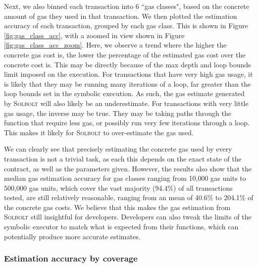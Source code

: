 Next, we also binned each transaction into 6 ``gas classes", based on the concrete amount of 
gas they used in that transaction. We then plotted the estimation accuracy of each transaction, 
grouped by each gas class. This is shown in Figure \ref{fig:gas_class_acc}, with a zoomed in view
shown in Figure \ref{fig:gas_class_acc_zoom}. Here, we observe a trend where the higher the
concrete gas cost is, the lower the percentage of the estimated gas cost over the concrete cost is.
This may be directly because of the max depth and loop bounds limit imposed on the execution.
For transactions that have very high gas usage, it is likely that they may be running many iterations
of a loop, far greater than the loop bounds set in the symbolic execution. As such, the gas
estimate generated by \textcolor{NavyBlue}{\textsc{Solbolt}} will also likely be an underestimate. For transactions with very
little gas usage, the inverse may be true. They may be taking paths through the function that require
less gas, or possibly run very few iterations through a loop. This makes it likely for \textcolor{NavyBlue}{\textsc{Solbolt}}
to over-estimate the gas used. 

We can clearly see that precisely estimating the concrete gas used
by every transaction is not a trivial task, as each this depends on the exact state of the contract, 
as well as the parameters given. However, the results also show that the
median gas estimation accuracy for gas classes ranging from 10,000 gas units to 500,000 gas units,
which cover the vast majority (94.4\%) of all transactions tested,
are still relatively reasonable, ranging from an mean of 40.6\% to 204.1\% of the concrete gas costs. 
We believe that this makes the gas estimation from \textcolor{NavyBlue}{\textsc{Solbolt}} still insightful for developers.
Developers can also tweak the limits of the symbolic executor to match what is expected
from their functions, which can potentially produce more accurate estimates.

\subsubsection{Estimation accuracy by coverage}

